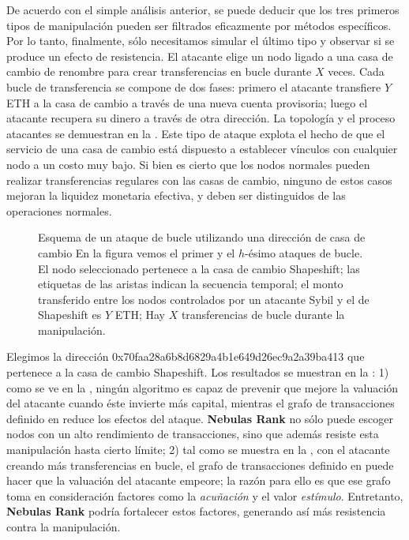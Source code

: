 De acuerdo con el simple análisis anterior, se puede deducir que los tres primeros tipos de manipulación pueden ser filtrados eficazmente por métodos específicos. Por lo tanto, finalmente, sólo necesitamos simular el último tipo y observar si se produce un efecto de resistencia. El atacante elige un nodo ligado a una casa de cambio de renombre para crear transferencias en bucle durante $X$ veces. Cada bucle de transferencia se compone de dos fases: primero el atacante transfiere $Y$ ETH a la casa de cambio a través de una nueva cuenta provisoria; luego el atacante recupera su dinero a través de otra dirección. La topología y el proceso atacantes se demuestran en la . Este tipo de ataque explota el hecho de que el servicio de una casa de cambio está dispuesto a establecer vínculos con cualquier nodo a un costo muy bajo. Si bien es cierto que los nodos normales pueden realizar transferencias regulares con las casas de cambio, ninguno de estos casos mejoran la liquidez monetaria efectiva, y deben ser distinguidos de las operaciones normales.
\begin{figure}[!ht]
	\centering
  
	\caption{Esquema de un ataque de bucle utilizando una dirección de casa de cambio \small{En la figura vemos el primer y el $h$-ésimo ataques de bucle. El nodo seleccionado pertenece a la casa de cambio Shapeshift; las etiquetas de las aristas indican la secuencia temporal; el monto transferido entre los nodos controlados por un atacante Sybil y el de Shapeshift es $Y$ ETH; Hay $X$ transferencias de bucle durante la manipulación.}}\label{fig:loop}
\end{figure}

Elegimos la dirección 0x70faa28a6b8d6829a4b1e649d26ec9a2a39ba413 que pertenece a la casa de cambio Shapeshift. Los resultados se muestran en la  : 1) como se ve en la , ningún algoritmo es capaz de prevenir que mejore la valuación del atacante cuando éste invierte más capital, mientras el grafo de transacciones definido en  reduce los efectos del ataque. \textbf{Nebulas Rank} no sólo puede escoger nodos con un alto rendimiento de transacciones, sino que además resiste esta manipulación hasta cierto límite; 2) tal como se muestra en la , con el atacante creando más transferencias en bucle, el grafo de transacciones definido en  puede hacer que la valuación del atacante empeore; la razón para ello es que ese grafo toma en consideración factores como la \textit{acuñación} y el valor \textit{estímulo}. Entretanto, \textbf{Nebulas Rank} podría fortalecer estos factores, generando así más resistencia contra la manipulación.

